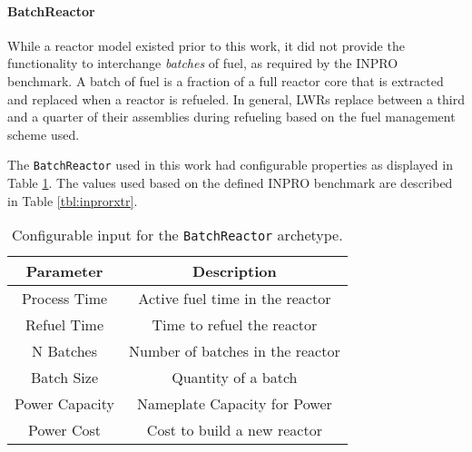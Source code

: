 \paragraph{BatchReactor}

While a reactor model existed prior to this work, it did not provide the
functionality to interchange \textit{batches} of fuel, as required by the INPRO
benchmark. A batch of fuel is a fraction of a full reactor core that is
extracted and replaced when a reactor is refueled. In general, LWRs replace
between a third and a quarter of their assemblies during refueling based on the
fuel management scheme used.

The \texttt{BatchReactor} used in this work had configurable properties as
displayed in Table \ref{tbl:batchrxtr}. The values used based on the defined
INPRO benchmark are described in Table \ref{tbl:inprorxtr}.

\begin{table}[h]
\centering
\begin{tabular}{cc}
Parameter      & Description                     \\ \hline
Process Time   & Active fuel time in the reactor                        \\
Refuel Time    & Time to refuel the reactor                              \\
N Batches      & Number of batches in the reactor                         \\
Batch Size     & Quantity of a batch                                 \\
Power Capacity & Nameplate Capacity for Power                          \\
Power Cost     & Cost to build a new reactor      \\ \hline
\end{tabular}
\caption{Configurable input for the \texttt{BatchReactor} archetype.}
\label{tbl:batchrxtr}
\end{table}

